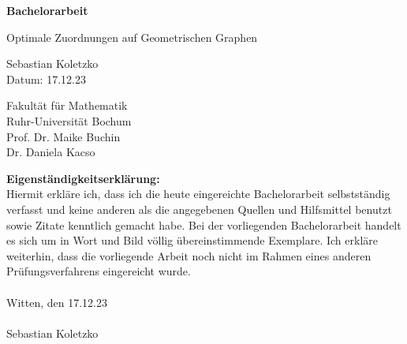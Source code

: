 \documentclass[a4paper, 12pt, twoside]{article}
\theoremstyle{Format1} %
\begin{document}
\newgeometry{} %
\begin{titlepage}
	\begin{center}
		\vspace*{1cm}

		\Huge
		\textbf{Bachelorarbeit}

		\vspace{0.5cm}
		\LARGE
		Optimale Zuordnungen auf Geometrischen Graphen

		\vspace{1.5cm}
		\large Sebastian Koletzko\\

		\vspace{1cm}
		Datum: 17.12.23

		\vfill

		\vspace{5cm}


		\large
		Fakultät für Mathematik
		\\
		Ruhr-Universität Bochum
		\\
		\vspace{0.5cm}
		Prof. Dr. Maike Buchin
		\\
		Dr. Daniela Kacso

	\end{center}
\end{titlepage}

\restoregeometry %

\newpage\null\thispagestyle{empty}\newpage %

\thispagestyle{empty} %

\textbf{Eigenständigkeitserklärung:}
\\
Hiermit erkläre ich, dass ich die heute eingereichte Bachelorarbeit selbstständig verfasst und keine anderen als die angegebenen Quellen und Hilfsmittel benutzt sowie Zitate kenntlich gemacht habe.
Bei der vorliegenden Bachelorarbeit handelt es sich um in Wort und Bild völlig übereinstimmende Exemplare. Ich erkläre weiterhin, dass die vorliegende Arbeit noch nicht im Rahmen eines anderen Prüfungsverfahrens eingereicht wurde.
\\
\\
Witten, den 17.12.23
\\
\\
Sebastian Koletzko
\end{document}
